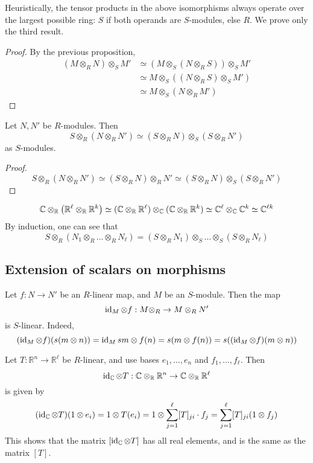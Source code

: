 Heuristically, the tensor products in the above isomorphisms always operate over the largest possible ring: \( S \) if both operands are \( S \)-modules, else \( R \).
We prove only the third result.
\begin{proof}
    By the previous proposition,
    \begin{align*}
        (M \otimes_R N) \otimes_S M' &\simeq (M \otimes_S (N \otimes_R S)) \otimes_S M' \\
        &\simeq M \otimes_S ((N \otimes_R S) \otimes_S M') \\
        &\simeq M \otimes_S (N \otimes_R M')
    \end{align*}
\end{proof}
\begin{corollary}
    Let \( N, N' \) be \( R \)-modules.
    Then
    \[ S \otimes_R (N \otimes_R N') \simeq (S \otimes_R N) \otimes_S (S \otimes_R N') \]
    as \( S \)-modules.
\end{corollary}
\begin{proof}
    \[ S \otimes_R (N \otimes_R N') \simeq (S \otimes_R N) \otimes_R N' \simeq (S \otimes_R N) \otimes_S (S \otimes_R N') \]
\end{proof}
\begin{example}
    \[ \mathbb C \otimes_{\mathbb R} \qty(\mathbb R^\ell \otimes_{\mathbb R} \mathbb R^k) \simeq (\mathbb C \otimes_{\mathbb R} \mathbb R^\ell) \otimes_{\mathbb C} (\mathbb C \otimes_{\mathbb R} \mathbb R^k) \simeq \mathbb C^\ell \otimes_{\mathbb C} \mathbb C^k \simeq \mathbb C^{\ell k} \]
    By induction, one can see that
    \[ S \otimes_R (N_1 \otimes_R \dots \otimes_R N_\ell) = (S \otimes_R N_1) \otimes_S \dots \otimes_S (S \otimes_R N_\ell) \]
\end{example}

\subsection{Extension of scalars on morphisms}
Let \( f : N \to N' \) be an \( R \)-linear map, and \( M \) be an \( S \)-module.
Then the map
\[ \operatorname{id}_M \otimes f : M \otimes_R \to M \otimes_R N' \]
is \( S \)-linear.
Indeed,
\[ (\operatorname{id}_M \otimes f)(s(m \otimes n)) = \operatorname{id}_M sm \otimes f(n) = s(m \otimes f(n)) = s((\operatorname{id}_M \otimes f)(m \otimes n)) \]
\begin{example}
    Let \( T : \mathbb R^n \to \mathbb R^\ell \) be \( R \)-linear, and use bases \( e_1, \dots, e_n \) and \( f_1, \dots, f_\ell \).
    Then
    \[ \operatorname{id}_{\mathbb C} \otimes T : \mathbb C \otimes_{\mathbb R} \mathbb R^n \to \mathbb C \otimes_{\mathbb R} \mathbb R^\ell \]
    is given by
    \[ (\operatorname{id}_{\mathbb C} \otimes T)(1 \otimes e_i) = 1 \otimes T(e_i) = 1 \otimes \sum_{j=1}^\ell [T]_{ji} \cdot f_j = \sum_{j=1}^\ell [T]_{ji} (1 \otimes f_j) \]
    This shows that the matrix \( [\operatorname{id}_{\mathbb C} \otimes T] \) has all real elements, and is the same as the matrix \( [T] \).
\end{example}

